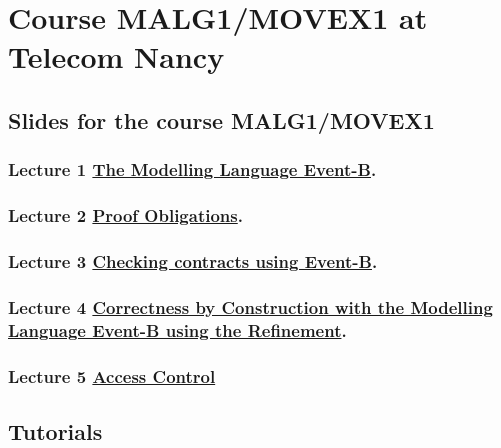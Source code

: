 \documentclass[ 12pt]{article}
\begin{document}
\section{Course MALG1/MOVEX1 at Telecom Nancy}
\label{sec:course-mcfsi-at}


\subsection{Slides for the course MALG1/MOVEX1}
\label{sec:slides}



\subsubsection{Lecture 1
  \href{http://mery54.github.io/teaching/malg/lecturesnotes/movexlect1.pdf}{The 
    Modelling Language Event-B}. 
}


\subsubsection{Lecture 2
    \href{http://mery54.github.io/teaching/mosos/lecturesnotes/mcfsi-po.pdf}{Proof
      Obligations}.}


  
\subsubsection{Lecture 3
    \href{http://mery54.github.io/teaching/mosos/lecturesnotes/mcfsi-verification.pdf}{Checking
      contracts using Event-B}.}

  

  \subsubsection{Lecture 4
    \href{http://mery54.github.io/teaching/mosos/lecturesnotes/mcfsi-lect2.pdf}{Correctness by Construction with the  
      Modelling Language Event-B using the Refinement}.}
\label{sec:lect-3-hrefhttp:m}


\subsubsection{ Lecture 5 
    \href{http://mery54.github.io/teaching/mosos/lecturesnotes/mcfsi-lect3.pdf}{Access 
      Control }
}



\subsection{Tutorials}
\end{document}
